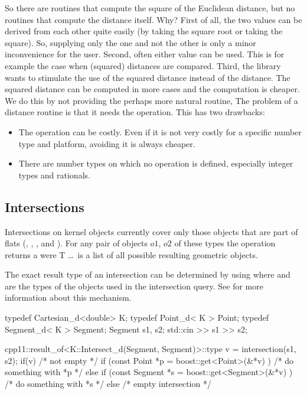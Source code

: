 So there are routines that compute the square of the Euclidean
distance, but no routines that compute the distance itself. Why?
First of all, the two values can be derived from each other quite
easily (by taking the square root or taking the square). So, supplying
only the one and not the other is only a minor inconvenience for the
user.  Second, often either value can be used. This is for example the
case when (squared) distances are compared.  Third, the library wants
to stimulate the use of the squared distance instead of the distance.
The squared distance can be computed in more cases and the computation
is cheaper.  We do this by not providing the perhaps more natural
routine, The problem of a distance routine is that it needs the
 operation.  This has two drawbacks:
\begin{itemize}
\item The  operation can be costly. Even if it is not
  very costly for a specific number type and platform, avoiding it is
  always cheaper.
\item There are number types on which no  operation is
  defined, especially integer types and rationals.
\end{itemize}

\subsection{Intersections}

Intersections on kernel objects currently cover only those objects
that are part of flats (, ,
, and ).  For any pair of objects
$o1$, $o2$ of these types the operation 
returns a 
were T \ldots\ is a list of all possible resulting geometric objects.

The exact result type of an intersection can be determined by using
where  and  are the types of the objects
used in the intersection query. See
for more information about this mechanism.

\ccExample 
\ccHtmlLinksOff%
\begin{cprog}
  typedef Cartesian_d<double> K;
  typedef Point_d< K >        Point;
  typedef Segment_d< K >      Segment;
  Segment s1, s2;
  std::cin >> s1 >> s2;

  cpp11::result_of<K::Intersect_d(Segment, Segment)>::type
    v = intersection(s1, s2);
  if(v) {
    /* not empty */
    if (const Point *p = boost::get<Point>(&*v) ) {
      /* do something with *p */
    } else if (const Segment *s = boost::get<Segment>(&*v) ) {
      /* do something with *s */
    }
  } else {
    /* empty intersection */
  }
\end{cprog}
\ccHtmlLinksOn%

